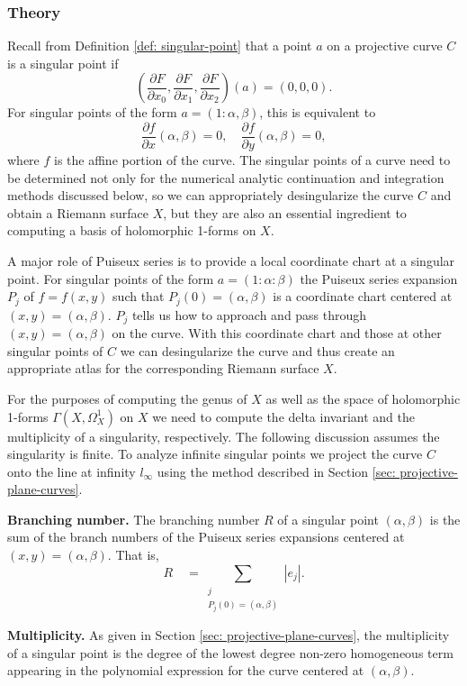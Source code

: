 %
\subsubsection*{Theory}
%

Recall from Definition \ref{def: singular-point} that a point $a$ on a
projective curve $C$ is a singular point if
\[
    \left(
      \frac{\partial F}{\partial x_0},
      \frac{\partial F}{\partial x_1},
      \frac{\partial F}{\partial x_2}
    \right) (a)
    = (0,0,0).
\]
For singular points of the form $a = (1 : \alpha, \beta)$, this is
equivalent to
\[
    \frac{\partial f}{\partial x} (\alpha,\beta) = 0, \quad
    \frac{\partial f}{\partial y} (\alpha,\beta) = 0,
\]
where $f$ is the affine portion of the curve. The singular points of a
curve need to be determined not only for the numerical analytic
continuation and integration methods discussed below, so we can
appropriately desingularize the curve $C$ and obtain a Riemann surface
$X$, but they are also an essential ingredient to computing a basis of
holomorphic 1-forms on $X$.

A major role of Puiseux series is to provide a local coordinate chart at
a singular point. For singular points of the form $a = (1 : \alpha :
\beta)$ the Puiseux series expansion $P_j$ of $f = f(x,y)$ such that
$P_j(0) = (\alpha, \beta)$ is a coordinate chart centered at $(x,y) =
(\alpha, \beta)$. $P_j$ tells us how to approach and pass through $(x,y)
= (\alpha, \beta)$ on the curve. With this coordinate chart and those at
other singular points of $C$ we can desingularize the curve and thus
create an appropriate atlas for the corresponding Riemann surface $X$.

For the purposes of computing the genus of $X$ as well as the space of
holomorphic 1-forms $\Gamma(X,\Omega_X^1)$ on $X$ we need to compute the
delta invariant and the multiplicity of a singularity, respectively. The
following discussion assumes the singularity is finite. To analyze
infinite singular points we project the curve $C$ onto the line at
infinity $l_\infty$ using the method described in Section \ref{sec:
  projective-plane-curves}.

{\bf Branching number.} The branching number $R$ of a singular point
$(\alpha,\beta)$ is the sum of the branch numbers of the Puiseux series
expansions centered at $(x,y) = (\alpha,\beta)$. That is,
\[
    R \quad = \sum_{\substack{j \\ P_j(0)=(\alpha,\beta)}} |e_j|.
\]

{\bf Multiplicity.} As given in Section \ref{sec:
  projective-plane-curves}, the multiplicity of a singular point is the
degree of the lowest degree non-zero homogeneous term appearing in the
polynomial expression for the curve centered at $(\alpha, \beta)$.


